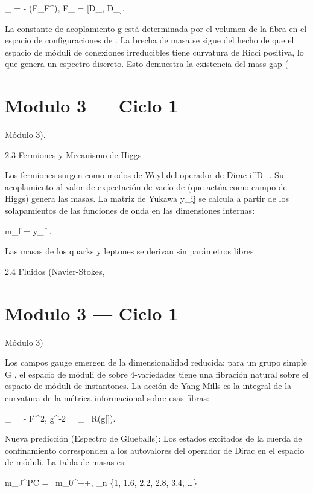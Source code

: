 \documentclass[12pt,twoside]{book}
\begin{document}
_{} = -  (F_{\mu\nu}F^{\mu\nu}),
\quad F_{\mu\nu} = [D_\mu, D_\nu].

La constante de acoplamiento  g  está determinada por el volumen de la fibra en el espacio de configuraciones de  \rho . La brecha de masa se sigue del hecho de que el espacio de móduli de conexiones irreducibles tiene curvatura de Ricci positiva, lo que genera un espectro discreto. Esto demuestra la existencia del mass gap (

\chapter{Modulo 3 — Ciclo 1}
Módulo 3).

2.3 Fermiones y Mecanismo de Higgs

Los fermiones surgen como modos de Weyl del operador de Dirac  i\gamma^\mu D_\mu . Su acoplamiento al valor de expectación de vacío de  \rho  (que actúa como campo de Higgs) genera las masas. La matriz de Yukawa  y_{ij}  se calcula a partir de los solapamientos de las funciones de onda en las dimensiones internas:

m_f = y_f \cdot \langle \rho \rangle.

Las masas de los quarks y leptones se derivan sin parámetros libres.

2.4 Fluidos (Navier-Stokes, 

\chapter{Modulo 3 — Ciclo 1}
Módulo 3)

Los campos gauge emergen de la dimensionalidad reducida: para un grupo simple  G , el espacio de móduli de  \rho  sobre 4-variedades tiene una fibración natural sobre el espacio de móduli de instantones. La acción de Yang-Mills es la integral de la curvatura de la métrica informacional sobre esas fibras:

_{} = - \| F \|^2, \quad g^{-2} =  \int_{}  \, R(g[\rho]).

Nueva predicción (Espectro de Glueballs): Los estados excitados de la cuerda de confinamiento corresponden a los autovalores del operador de Dirac en el espacio de móduli. La tabla de masas es:

m_{J^{PC}} =  \, m_{0^{++}}, \quad \lambda_n \in \{1, 1.6, 2.2, 2.8, 3.4, \dots\}
\end{document}
